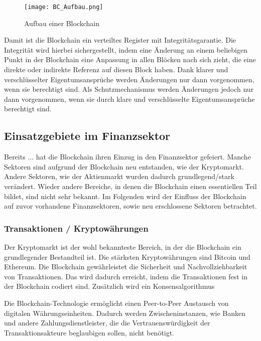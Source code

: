 \begin{figure}[h!]
    \texttt{[image: BC\_Aufbau.png]}
    \caption{Aufbau einer Blockchain \cite[p.~19]{fill2020blockchain}}
    \label{fig:BC_Aufbau}
\end{figure}

Damit ist die Blockchain ein verteiltes Register mit Integritätsgarantie. Die Integrität 
wird hierbei sichergestellt, indem eine Änderung an einem beliebigen Punkt in der
Blockchain eine Anpassung in allen Blöcken nach sich zieht, die eine direkte oder
indirekte Referenz auf diesen Block haben. Dank klarer und verschlüsselter Eigentumsansprüche
werden Änderungen nur dann vorgenommen, wenn sie berechtigt sind.
Als Schutzmechanismus werden Änderungen jedoch nur dann vorgenommen, wenn sie durch klare
und verschlüsselte Eigentumsansprüche berechtigt sind.
\cite[p.~22]{fill2020blockchain} 


\subsection{Einsatzgebiete im Finanzsektor}
Bereits ... hat die Blockchain ihren Einzug in den Finanzsektor gefeiert. Manche
Sektoren sind aufgrund der Blockchain neu entstanden, wie der Kryptomarkt. Andere Sektoren,
wie der Aktienmarkt wurden dadurch grundlegend/stark verändert. Wieder andere Bereiche, in denen die Blockchain
einen essentiellen Teil bildet, sind nicht sehr bekannt. Im Folgenden wird der Einfluss
der Blockchain auf zuvor vorhandene Finanzsektoren, sowie neu erschlossene Sektoren 
betrachtet.

\subsubsection{Transaktionen / Kryptowährungen}
Der Kryptomarkt ist der wohl bekannteste Bereich, in der die Blockchain ein 
grundlegender Bestandteil ist. 
Die stärksten Kryptowährungen sind Bitcoin und Ethereum. 
Die Blockchain gewährleistet die Sicherheit und Nachvollziehbarkeit von Transaktionen.
\cite[p.~168]{chowdhary2025smart}
Das wird dadurch erreicht, indem die Transaktionen fest in der Blockchain codiert sind.
 \cite[p.~11f]{pirafelnerblockchaintechnologie}
 Zusätzlich wird ein Konsensalgorithmus
 \cite[p.~32]{fill2020blockchain}

Die Blockchain-Technologie ermöglicht einen Peer-to-Peer Austausch von digitalen
Währungseinheiten. Dadurch werden Zwischeninstanzen, wie Banken und andere Zahlungsdienstleister,
die die Vertrauenswürdigkeit der Transaktionsakteure beglaubigen sollen, nicht benötigt.
\cite[p.~32]{fill2020blockchain}



